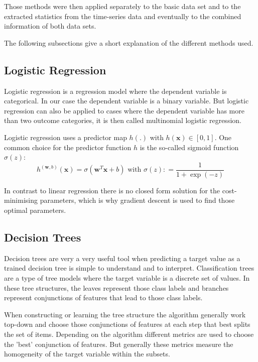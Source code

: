 \documentclass[a4paper,11pt]{article}
\begin{document}
Those methods were then applied separately to the basic data set and to the extracted statistics from the time-series data and eventually to the combined information of both data sets.

The following subsections give a short explanation of the different methods used.

\subsection{Logistic Regression}

Logistic regression is a regression model where the dependent variable is categorical. In our case the dependent variable is a binary variable. But logistic regression can also be applied to cases where the dependent variable has more than two outcome categories, it is then called multinomial logistic regression.

Logistic regression uses a  predictor map $ h(.)$ with $h ( \mathbf { x } ) \in [ 0,1] $. One common choice for the predictor function $h$ is the so-called sigmoid function $ \sigma ( z ) $: 
$$ h ^ { ( \mathbf { w } ,b ) } ( \mathbf { x } ) = \sigma \left( \mathbf { w } ^ { T } \mathbf { x } + b \right) \text{ with } \sigma ( z ) : = \frac{1}{1+ \exp ( - z )}  $$

In contrast to linear regression there is no closed form solution for the cost-minimising parameters, which is why gradient descent is used to find those optimal parameters.

\subsection{Decision Trees}

Decision trees are very a very useful tool when predicting a target value as a trained decision tree is simple to understand and to interpret. Classification trees are a type of tree models where the target variable is a discrete set of values. In these tree structures, the leaves represent those class labels and branches represent conjunctions of features that lead to those class labels. 

When constructing or learning the tree structure the algorithm generally work top-down and choose those conjunctions of features at each step that best splits the set of items. Depending on the algorithm different metrics are used to choose the 'best' conjunction of features. But generally these metrics measure the homogeneity of the target variable within the subsets.
\end{document}
